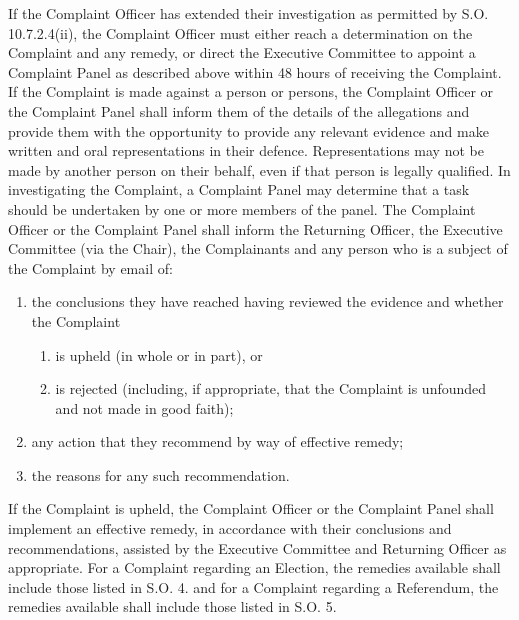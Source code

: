 \npara If the Complaint Officer has extended their investigation as permitted by S.O. 10.7.2.4(ii), the Complaint Officer must either reach a determination on the Complaint and any remedy, or direct the Executive Committee to appoint a Complaint Panel as described above within 48 hours of receiving the Complaint.
\npara If the Complaint is made against a person or persons, the Complaint Officer or the Complaint Panel shall inform them of the details of the allegations and provide them with the opportunity to provide any relevant evidence and make written and oral representations in their defence. Representations may not be made by another person on their behalf, even if that person is legally qualified.
\npara In investigating the Complaint, a Complaint Panel may determine that a task should be undertaken by one or more members of the panel.
\npara The Complaint Officer or the Complaint Panel shall inform the Returning Officer, the Executive Committee (via the Chair), the Complainants and any person who is a subject of the Complaint by email of:
\begin{enumerate}
\item the conclusions they have reached having reviewed the evidence and whether the Complaint
\begin{enumerate}
\item is upheld (in whole or in part), or
\item is rejected (including, if appropriate, that the Complaint is unfounded and not made in good faith);
\end{enumerate}
\item any action that they recommend by way of effective remedy;
\item the reasons for any such recommendation.
\end{enumerate}
\npara If the Complaint is upheld, the Complaint Officer or the Complaint Panel shall implement an effective remedy, in accordance with their conclusions and recommendations, assisted by the Executive Committee and Returning Officer as appropriate.  For a Complaint regarding an Election, the remedies available shall include those listed in S.O. 4. and for a Complaint regarding a Referendum, the remedies available shall include those listed in S.O. 5.
